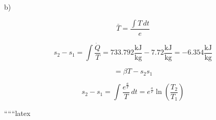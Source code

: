 b)

\[
\bar{T} = \frac{\int T \, dt}{e}
\]

\[
s_2 - s_1 = \int \frac{\dot{Q}}{T} = 733.792 \frac{\text{kJ}}{\text{kg}} - 7.72 \frac{\text{kJ}}{\text{kg}} = -6.354 \frac{\text{kJ}}{\text{kg}}
\]

\[
= \beta T - s_2 s_1
\]

\[
s_2 - s_1 = \int \frac{e^{\frac{a}{T}}}{T} \, dt = e^{\frac{a}{T}} \ln \left( \frac{T_2}{T_1} \right)
\]

``````latex